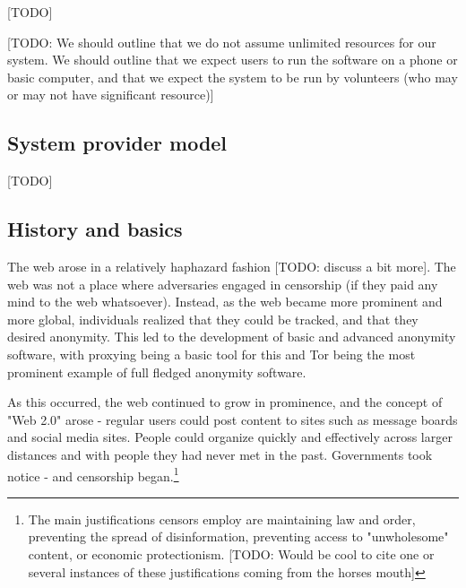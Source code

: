 \documentclass[12pt]{report}
\begin{document}
[TODO]

[TODO: We should outline that we do not assume unlimited resources for our system. We should outline that we expect users to run the software on a phone or basic computer, and that we expect the system to be run by volunteers (who may or may not have significant resource)]

\subsection{System provider model}

[TODO]

\subsection{History and basics}

The web arose in a relatively haphazard fashion [TODO: discuss a bit more]. The web was not a place where adversaries engaged in censorship (if they paid any mind to the web whatsoever). Instead, as the web became more prominent and more global, individuals realized that they could be tracked, and that they desired anonymity. This led to the development of basic and advanced anonymity software, with proxying being a basic tool for this and Tor being the most prominent example of full fledged anonymity software.

As this occurred, the web continued to grow in prominence, and the concept of "Web 2.0" arose - regular users could post content to sites such as message boards and social media sites. People could organize quickly and effectively across larger distances and with people they had never met in the past. Governments took notice - and censorship began.\footnote{The main justifications censors employ are maintaining law and order, preventing the spread of disinformation, preventing access to "unwholesome" content, or economic protectionism. [TODO: Would be cool to cite one or several instances of these justifications coming from the horses mouth]}
\end{document}
